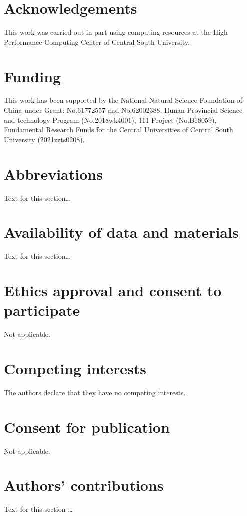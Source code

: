 \documentclass{bmcart}
\begin{document}
\begin{backmatter}

\section*{Acknowledgements}%
This work was carried out in part using computing resources at the High Performance Computing Center of Central South University.

\section*{Funding}%
This work has been supported by the National Natural Science Foundation of China under Grant: No.61772557 and No.62002388, Hunan Provincial Science and technology Program (No.2018wk4001), 111 Project (No.B18059), Fundamental Research Funds for the Central Universities of Central South University (2021zzts0208).

\section*{Abbreviations}%
Text for this section\ldots

\section*{Availability of data and materials}%
Text for this section\ldots

\section*{Ethics approval and consent to participate}%
Not applicable.

\section*{Competing interests}
The authors declare that they have no competing interests.

\section*{Consent for publication}%
Not applicable.

\section*{Authors' contributions}
Text for this section \ldots


\end{backmatter}
\end{document}

